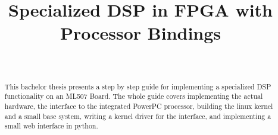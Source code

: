 \documentclass[11pt,technote,a4paper,onecolumn,dvips]{IEEEtran}
\begin{document}
\title{\huge Specialized DSP in FPGA with Processor Bindings}
\author{\\
}

\maketitle

\begin{abstract}
This bachelor thesis presents a step by step guide for implementing a
specialized DSP functionality on an ML507 Board. The whole guide
covers implementing the actual hardware, the interface to the integrated
PowerPC processor, building the linux kernel and a small base system,
writing a kernel driver for the interface, and implementing a small
web interface in python.
\end{abstract}

\renewcommand{\contentsname}{\small{Table of Contents}}
\tableofcontents
\end{document}
